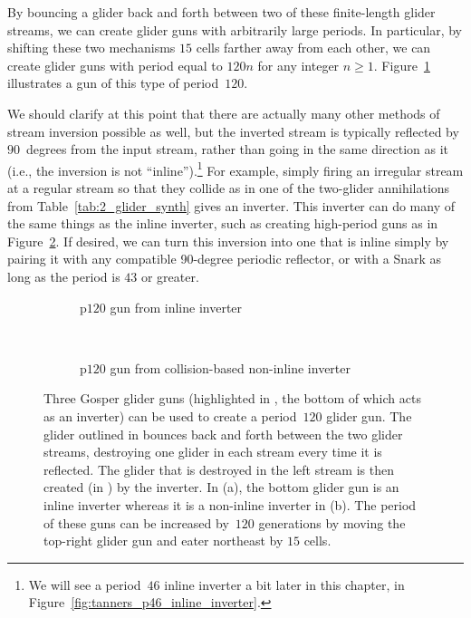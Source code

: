 By bouncing a glider back and forth between two of these finite-length glider streams, we can create glider guns with arbitrarily large periods. In particular, by shifting these two mechanisms $15$ cells farther away from each other, we can create glider guns with period equal to $120n$ for any integer $n \geq 1$. Figure~\ref{fig:inline_inverter_p120_gun} illustrates a gun of this type of period~$120$.

We should clarify at this point that there are actually many other methods of stream inversion possible as well, but the inverted stream is typically reflected by $90$~degrees from the input stream, rather than going in the same direction as it (i.e., the inversion is not ``inline'').\footnote{We will see a period~$46$ inline inverter a bit later in this chapter, in Figure~\ref{fig:tanners_p46_inline_inverter}.} For example, simply firing an irregular stream at a regular stream so that they collide as in one of the two-glider annihilations from Table~\ref{tab:2_glider_synth} gives an inverter. This inverter can do many of the same things as the inline inverter, such as creating high-period guns as in Figure~\ref{fig:inverter_p120_gun}. If desired, we can turn this inversion into one that is inline simply by pairing it with any compatible 90-degree periodic reflector, or with a Snark as long as the period is $43$ or greater.

\begin{figure}[!htb]
	\centering
	\begin{subfigure}{.46\textwidth}
		\centering
		\caption{p$120$ gun from inline inverter}
		\label{fig:inline_inverter_p120_gun}
	\end{subfigure} \ \ %
	\begin{subfigure}{.5\textwidth}
		\centering
		\caption{p$120$ gun from collision-based non-inline inverter}
		\label{fig:inverter_p120_gun}
	\end{subfigure}
	\caption{Three Gosper glider guns (highlighted in , the bottom of which acts as an inverter) can be used to create a period~$120$ glider gun. The glider outlined in  bounces back and forth between the two  glider streams, destroying one glider in each stream every time it is reflected. The glider that is destroyed in the left stream is then created (in ) by the inverter. In (a), the bottom glider gun is an inline inverter whereas it is a non-inline inverter in (b). The period of these guns can be increased by~$120$ generations by moving the top-right glider gun and eater northeast by $15$ cells.}\label{fig:inverter_p120_gun_inline_and_not}
\end{figure}

